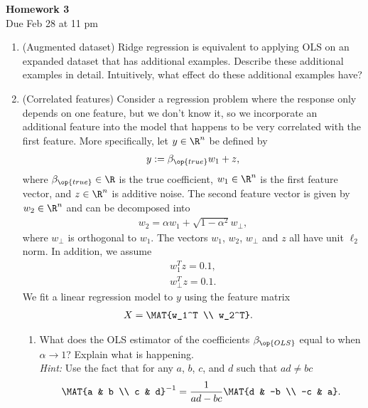 \documentclass[12pt,twoside]{article}
\begin{document}
\begin{center}
{\large{\textbf{Homework 3}} } \vspace{0.2cm}\\
Due Feb 28 at 11 pm
\end{center}

\begin{enumerate}

\item (Augmented dataset) Ridge regression is equivalent to applying OLS on an expanded dataset that has additional examples. Describe these additional examples in detail. Intuitively, what effect do these additional examples have?

\item  (Correlated features) Consider a regression problem where the response only depends on one feature, but we don't know it, so we incorporate an additional feature into the model that happens to be very correlated with the first feature. More specifically, let $y \in \R^{n}$ be defined by
\begin{align}
y := \beta_{\op{true}} w_1 + z, 
\end{align}
where $\beta_{\op{true}} \in \R$ is the true coefficient, $w_1 \in \R^n$ is the first feature vector, and $z \in \R^{n}$ is additive noise. The second feature vector is given by $w_2\in \R^n$ and can be decomposed into
\begin{align}
w_2 = \alpha w_1 + \sqrt{1-\alpha^2} w_{\perp},
\end{align}  
where $w_{\perp}$ is orthogonal to $w_1$. The vectors $w_1$, $w_2$, $w_{\perp}$ and $z$ all have unit $\ell_2$ norm. In addition, we assume
\begin{align}
w_1^Tz = 0.1, \\
w_{\perp}^Tz = 0.1.
\end{align}
We fit a linear regression model to $y$ using the feature matrix 
  \begin{align}
  X & = \MAT{w_1^T \\ w_2^T}.
  \end{align} 
 \begin{enumerate}
  \item What does the OLS estimator of the coefficients $\beta_{\op{OLS}}$ equal to when $\alpha \rightarrow 1$? Explain what is happening. \\
\emph{Hint:} Use the fact that for any $a$, $b$, $c$, and $d$ such that $ad \neq bc$
\begin{align}
 \MAT{a & b \\ c & d}^{-1} = \frac{1}{ad-bc} \MAT{d & -b \\ -c & a}.

\end{align}
\end{enumerate}
\end{enumerate}
\end{document}
